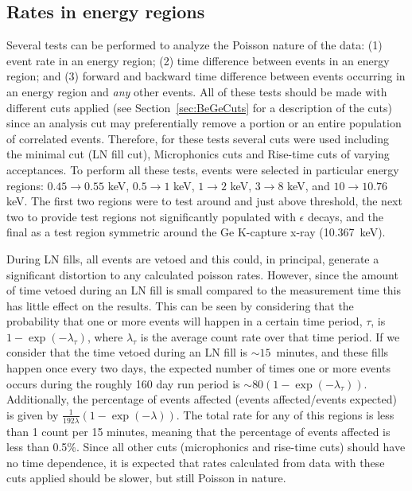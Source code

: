 		\subsection{Rates in energy regions}
		\label{sec:BeGeRate}	
		
		Several tests can be performed to analyze the Poisson nature of the data: (1) event rate in an energy region; (2) time difference between events in an energy region; and (3) forward and backward time difference between events occurring in an energy region and \emph{any} other events.  All of these tests should be made with different cuts applied (see Section~\ref{sec:BeGeCuts} for a description of the cuts) since an analysis cut may preferentially remove a portion or an entire population of correlated events.  Therefore, for these tests several cuts were used including the minimal cut (LN fill cut), Microphonics cuts and Rise-time cuts of varying acceptances.  To perform all these tests, events were selected in particular energy regions: $0.45\to0.55$ keV, $0.5\to1$ keV, $1\to2$ keV, $3\to8$ keV, and $10\to10.76$ keV.  The first two regions were to test around and just above threshold, the next two to provide test regions not significantly populated with $\epsilon$ decays, and the final as a test region symmetric around the Ge K-capture x-ray (10.367~keV).
		
	During LN fills, all events are vetoed and this could, in principal, generate a significant distortion to any calculated poisson rates.  However, since the amount of time vetoed during an LN fill is small compared to the measurement time this has little effect on the results.  This can be seen by considering that the probability that one or more events will happen in a certain time period, $\tau$, is $1 - \exp(-\lambda_{\tau})$, where $\lambda_{\tau}$ is the average count rate over that time period.  If we consider that the time vetoed during an LN fill is $\sim15$~minutes, and these fills happen once every two days, the expected number of times one or more events occurs during the roughly 160 day run period is $\sim80 (1 - \exp(-\lambda_{\tau}) )$.  Additionally, the percentage of events affected (events affected/events expected) is given by $\frac{1}{192 \lambda}\left(1 - \exp(-\lambda)\right)$.  The total rate for any of this regions is less than 1 count per 15 minutes, meaning that the percentage of events affected is less than 0.5\%.  Since all other cuts (microphonics and rise-time cuts) should have no time dependence, it is expected that rates calculated from data with these cuts applied should be slower, but still Poisson in nature.  
	
